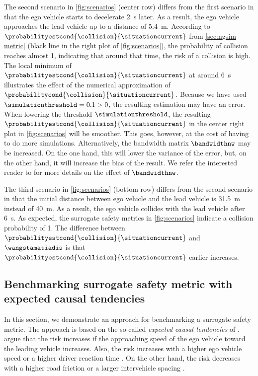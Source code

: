The second scenario in \cref{fig:scenarios} (center row) differs from the first scenario in that the ego vehicle starts to decelerate \SI{2}{\second} later.
As a result, the ego vehicle approaches the lead vehicle up to a distance of \SI{5.4}{\meter}.
According to $\probabilityestcond{\collision}{\situationcurrent}$ from \cref{sec:ngsim metric} (black line in the right plot of \cref{fig:scenarios}), the probability of collision reaches almost 1, indicating that around that time, the risk of a collision is high.
The local minimum of $\probabilityestcond{\collision}{\situationcurrent}$ at around \SI{6}{\second} illustrates the effect of the numerical approximation of $\probabilitycond{\collision}{\situationcurrent}$.
Because we have used $\simulationthreshold=0.1>0$, the resulting estimation may have an error. 
When lowering the threshold $\simulationthreshold$, the resulting $\probabilityestcond{\collision}{\situationcurrent}$ in the center right plot in \cref{fig:scenarios} will be smoother. 
This goes, however, at the cost of having to do more simulations.
Alternatively, the bandwidth matrix $\bandwidthnw$ may be increased. 
On the one hand, this will lower the variance of the error, but, on the other hand, it will increase the bias of the result.
We refer the interested reader to \autocite{chen2017tutorial} for more details on the effect of $\bandwidthnw$.

The third scenario in \cref{fig:scenarios} (bottom row) differs from the second scenario in that the initial distance between ego vehicle and the lead vehicle is \SI{31.5}{\meter} instead of \SI{40}{\meter}. 
As a result, the ego vehicle collides with the lead vehicle after \SI{6}{\second}.
As expected, the surrogate safety metrics in \cref{fig:scenarios} indicate a collision probability of 1.
The difference between $\probabilityestcond{\collision}{\situationcurrent}$ and $\wangstamatiadis$ is that $\probabilityestcond{\collision}{\situationcurrent}$ earlier increases. 



\subsection{Benchmarking surrogate safety metric with expected causal tendencies}
\label{sec:tendencies}

In this section, we demonstrate an approach for benchmarking a surrogate safety metric.
The approach is based on the so-called \emph{expected causal tendencies} of \textcite{mullakkal2017comparative}.
\textcite{mullakkal2017comparative} argue that the risk increases if the approaching speed of the ego vehicle toward the leading vehicle increases.
Also, the risk increases with a higher ego vehicle speed \autocite{aarts2006driving} or a higher driver reaction time \autocite{klauer2006impact}.
On the other hand, the risk decreases with a higher road friction \autocite{wallman2001friction} or a larger intervehicle spacing \autocite{mullakkal2017comparative}.


